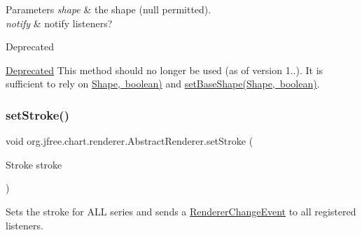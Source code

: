 \begin{DoxyParams}{Parameters}
{\em shape} & the shape ({\ttfamily null} permitted). \\
\hline
{\em notify} & notify listeners?\\
\hline
\end{DoxyParams}
\begin{DoxyRefDesc}{Deprecated}
\item[\mbox{\hyperlink{deprecated__deprecated000127}{Deprecated}}]This method should no longer be used (as of version 1..). It is sufficient to rely on \mbox{\hyperlink{}{Shape, boolean)}} and \mbox{\hyperlink{classorg_1_1jfree_1_1chart_1_1renderer_1_1_abstract_renderer_a20a150379e1a4ce65892c2a3929e18f1}{set\+Base\+Shape(\+Shape, boolean)}}. \end{DoxyRefDesc}
\mbox{\label{classorg_1_1jfree_1_1chart_1_1renderer_1_1_abstract_renderer_ae1a46d8ef2f30774ca1e67f7c0fe1372}} 
\subsubsection{\texorpdfstring{set\+Stroke()}{setStroke()}\hspace{0.1cm}{\footnotesize\ttfamily [1/2]}}
{\footnotesize\ttfamily void org.\+jfree.\+chart.\+renderer.\+Abstract\+Renderer.\+set\+Stroke (\begin{DoxyParamCaption}\item[{Stroke}]{stroke }\end{DoxyParamCaption})}

Sets the stroke for A\+LL series and sends a \mbox{\hyperlink{}{Renderer\+Change\+Event}} to all registered listeners.


